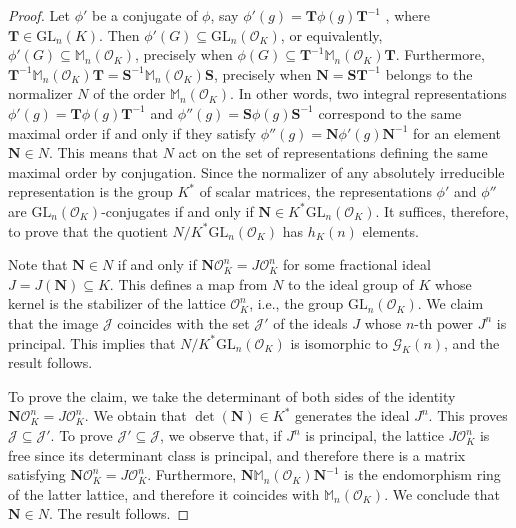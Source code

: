 \documentclass[10pt,a4paper]{amsart}
\begin{document}
\begin{proof}
    Let $\phi'$ be a conjugate of $\phi$, say 
    $\phi'(g)=\mathbf{T}\phi(g)\mathbf{T}^{-1}$ , where 
    $\mathbf{T}\in\mathrm{GL}_n(K)$. Then $\phi'(G)\subseteq
    \mathrm{GL}_n(\mathcal{O}_K)$, or equivalently, $\phi'(G)\subseteq
    \mathbb{M}_n(\mathcal{O}_K)$, precisely when $\phi(G)\subseteq
    \mathbf{T}^{-1}\mathbb{M}_n(\mathcal{O}_K)\mathbf{T}$. Furthermore,
    $\mathbf{T}^{-1}\mathbb{M}_n(\mathcal{O}_K)\mathbf{T}=
    \mathbf{S}^{-1}\mathbb{M}_n(\mathcal{O}_K)\mathbf{S}$, precisely when
    $\mathbf{N}=\mathbf{S}\mathbf{T}^{-1}$ belongs to the normalizer $N$ 
    of the order $\mathbb{M}_n(\mathcal{O}_K)$. In other words, 
    two integral representations 
    $\phi'(g)=\mathbf{T}\phi(g)\mathbf{T}^{-1}$ and
    $\phi''(g)=\mathbf{S}\phi(g)\mathbf{S}^{-1}$ correspond to the same
    maximal order if and only if they satisfy 
    $\phi''(g)=\mathbf{N}\phi'(g)\mathbf{N}^{-1}$ for an element 
    $\mathbf{N}\in N$. This means that $N$ act on the set of 
    representations defining the same maximal order by conjugation.
    Since the normalizer of any absolutely irreducible representation 
    is the group $K^*$ of scalar matrices, the representations $\phi'$
    and $\phi''$ are $\mathrm{GL}_n(\mathcal{O}_K)$-conjugates if and
    only if $\mathbf{N}\in K^*\mathrm{GL}_n(\mathcal{O}_K)$. 
    It suffices, therefore, to prove that the quotient 
    $N/K^*\mathrm{GL}_n(\mathcal{O}_K)$ has $h_K(n)$ elements.
    
    Note that $\mathbf{N}\in N$ if and only if
    $\mathbf{N} \mathcal{O}_K^n=J\mathcal{O}_K^n$ for some fractional ideal
    $J=J(\mathbf{N})\subseteq K$. This defines a map from $N$ to the ideal 
    group of $K$ whose kernel is the stabilizer of the lattice 
    $\mathcal{O}_K^n$, i.e., the group $\mathrm{GL}_n(\mathcal{O}_K)$.
    We claim that the image $\mathcal{J}$ coincides with the set $\mathcal{J}'$
    of the ideals $J$ whose $n$-th power $J^n$ is principal. This implies that
    $N/K^*\mathrm{GL}_n(\mathcal{O}_K)$ is isomorphic to 
    $\mathcal{G}_K(n)$, and the result follows.

    To prove the claim, we take the determinant of both sides of the identity 
    $\mathbf{N} \mathcal{O}_K^n=J\mathcal{O}_K^n$. We 
    obtain that $\det(\mathbf{N})\in K^*$ generates the ideal $J^n$.
    This proves $\mathcal{J}\subseteq\mathcal{J}'$. To prove 
    $\mathcal{J}'\subseteq\mathcal{J}$, we observe that, if $J^n$ is principal, 
    the lattice $J\mathcal{O}_K^n$ is free since its determinant class is 
    principal, and therefore there is a matrix satisfying 
    $\mathbf{N} \mathcal{O}_K^n=J\mathcal{O}_K^n$. Furthermore,
    $\mathbf{N}\mathbb{M}_n(\mathcal{O}_K)\mathbf{N}^{-1}$ is the endomorphism
    ring of the latter lattice, and therefore it coincides with
    $\mathbb{M}_n(\mathcal{O}_K)$. We conclude that $\mathbf{N}\in N$.
    The result follows.
\end{proof}
\end{document}
